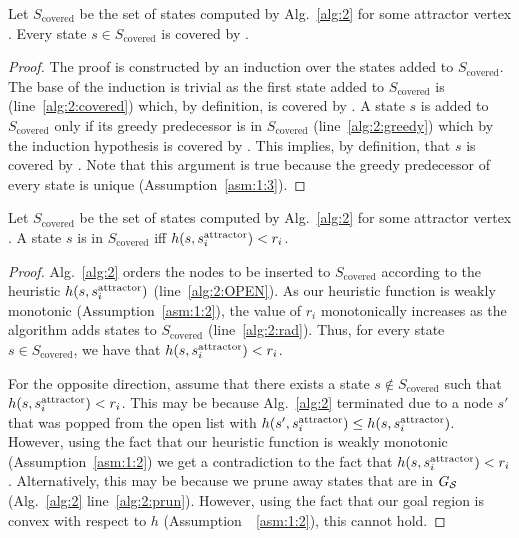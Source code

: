 \documentclass[a4paper]{report}
\begin{document}
\vspace{2mm}
\begin{lemma}
\label{lemma:covered-1}
Let $S_{\text{covered}}$ be the set of states computed by Alg.~\ref{alg:2} for some attractor vertex \sAttract.
%
Every state $s \in S_{\text{covered}}$ is covered by \sAttract.
\end{lemma}
%
\begin{proof}
The proof is constructed by an induction over the states added to $S_{\text{covered}}$.
The base of the induction is trivial as the first state added to $S_{\text{covered}}$  is \sAttract (line~\ref{alg:2:covered}) which, by definition, is covered by \sAttract.
%
A state $s$ is added to $S_{\text{covered}}$ only if its greedy predecessor is in $S_{\text{covered}}$ (line~\ref{alg:2:greedy}) which by the induction hypothesis is covered by \sAttract.
This implies, by definition, that $s$ is covered by \sAttract.
%
Note that this argument is true because the greedy predecessor of every state is unique (Assumption~\ref{asm:1:3}).
\end{proof}

\begin{lemma}
\label{lemma:covered-2}
Let $S_{\text{covered}}$ be the set of states computed by Alg.~\ref{alg:2} for some attractor vertex \sAttract.
%
A state $s$ is in $S_{\text{covered}}$ iff $h(s, s^{\text{attractor}}_i) < r_i$.
\end{lemma}

\begin{proof}
Alg.~\ref{alg:2} orders the nodes to be inserted to $S_{\text{covered}}$ according to the heuristic $h(s, s^{\text{attractor}}_i)$ (line~\ref{alg:2:OPEN}).
As our heuristic function is weakly monotonic (Assumption~\ref{asm:1:2}), the value of $r_i$ monotonically increases as the algorithm adds states to $S_{\text{covered}}$ (line~\ref{alg:2:rad}).
Thus, for every state $s \in S_{\text{covered}}$, we have that $h(s, s^{\text{attractor}}_i) < r_i$.

For the opposite direction, assume that there exists a state $s \notin S_{\text{covered}}$ such that $h(s, s^{\text{attractor}}_i) < r_i$.
This may be because Alg.~\ref{alg:2} terminated due to a node $s'$ that was popped from the open list with 
$h(s', s^{\text{attractor}}_i) \leq h(s, s^{\text{attractor}}_i)$.
However, using the fact that our heuristic function is weakly monotonic (Assumption~\ref{asm:1:2}) we get a contradiction to the fact that $h(s, s^{\text{attractor}}_i) < r_i$.
Alternatively, this may be because we prune away states that are in $G_\mathcal{S}$  (Alg.~\ref{alg:2} line~\ref{alg:2:prun}).
However, using the fact that our goal region is convex with respect to $h$ (Assumption~~\ref{asm:1:2}), this cannot hold.
\end{proof}
\end{document}
